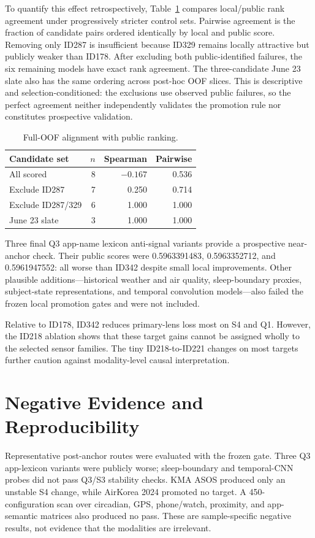 \documentclass[conference]{IEEEtran}
\begin{document}
To quantify this effect retrospectively, Table~\ref{tab:alignment} compares local/public rank agreement under progressively stricter control sets. Pairwise agreement is the fraction of candidate pairs ordered identically by local and public score. Removing only ID287 is insufficient because ID329 remains locally attractive but publicly weaker than ID178. After excluding both public-identified failures, the six remaining models have exact rank agreement. The three-candidate June 23 slate also has the same ordering across post-hoc OOF slices. This is descriptive and selection-conditioned: the exclusions use observed public failures, so the perfect agreement neither independently validates the promotion rule nor constitutes prospective validation.

\begin{table}[t]
\centering
\caption{Full-OOF alignment with public ranking.}
\label{tab:alignment}
\begin{tabular}{@{}lrrr@{}}
\toprule
Candidate set & $n$ & Spearman & Pairwise \\
\midrule
All scored & 8 & $-0.167$ & 0.536 \\
Exclude ID287 & 7 & 0.250 & 0.714 \\
Exclude ID287/329 & 6 & 1.000 & 1.000 \\
June 23 slate & 3 & 1.000 & 1.000 \\
\bottomrule
\end{tabular}
\end{table}

Three final Q3 app-name lexicon anti-signal variants provide a prospective near-anchor check. Their public scores were 0.5963391483, 0.5963352712, and 0.5961947552: all worse than ID342 despite small local improvements. Other plausible additions---historical weather and air quality, sleep-boundary proxies, subject-state representations, and temporal convolution models---also failed the frozen local promotion gates and were not included.

Relative to ID178, ID342 reduces primary-lens loss most on S4 and Q1. However, the ID218 ablation shows that these target gains cannot be assigned wholly to the selected sensor families. The tiny ID218-to-ID221 changes on most targets further caution against modality-level causal interpretation.

\section{Negative Evidence and Reproducibility}
Representative post-anchor routes were evaluated with the frozen gate. Three Q3 app-lexicon variants were publicly worse; sleep-boundary and temporal-CNN probes did not pass Q3/S3 stability checks. KMA ASOS produced only an unstable S4 change, while AirKorea 2024 promoted no target. A 450-configuration scan over circadian, GPS, phone/watch, proximity, and app-semantic matrices also produced no pass. These are sample-specific negative results, not evidence that the modalities are irrelevant.
\end{document}
